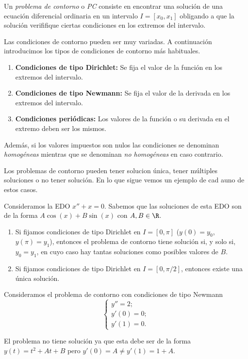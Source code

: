 \documentclass{article}
\begin{document}
\begin{definition}
  Un \emph{problema de contorno} o \emph{PC} consiste en encontrar una solución de una ecuación
  diferencial ordinaria en un intervalo $I = [x_0, x_1]$ obligando a que la solución verififique
  ciertas condiciones en los extremos del intervalo.
\end{definition}

Las condiciones de contorno pueden ser muy variadas. A continuación introducimos los tipos de
condiciones de contorno más habituales.

\begin{enumerate}
\item \textbf{Condiciones de tipo Dirichlet:} Se fija el valor de la función en los extremos del
  intervalo.
\item \textbf{Condiciones de tipo Newmann:} Se fija el valor de la derivada en los extremos del
  intervalo.
\item \textbf{Condiciones periódicas:} Los valores de la función o su derivada en el extremo deben
  ser los mismos.
\end{enumerate}

Además, si los valores impuestos son nulos las condiciones se denominan \emph{homogéneas} mientras
que se denominan \emph{no homogéneas} en caso contrario.

Los problemas de contorno pueden tener solucion única, tener múltiples soluciones o no tener
solución.  En lo que sigue vemos un ejemplo de cad auno de estos casos.

\begin{ex}
  Consideramos la EDO $x'' + x = 0$. Sabemos que las soluciones de esta EDO son de la forma
  $A \cos(x) + B \sin(x)$ con $A,B \in \R$.
  
  \begin{enumerate}
  \item Si fijamos condiciones de tipo Dirichlet en $I = [0,\pi]$ ($y(0) = y_0$, $y(\pi) = y_1$),
    entonces el problema de contorno tiene solución si, y solo si, $y_0 = y_1$, en cuyo caso hay
    tantas soluciones como posibles valores de $B$.
  \item Si fijamos condiciones de tipo Dirichlet en $I = [0, \pi / 2]$, entonces existe una única
    solución.
  \end{enumerate}
\end{ex}

\begin{ex} \label{ex:no-sol} Consideramos el problema de contorno con condiciones de tipo Newmann
  \[
    \begin{cases}
      y'' = 2; \\
      y'(0) = 0; \\
      y'(1) = 0.
    \end{cases}
  \]

  El problema no tiene solución ya que esta debe ser de la forma $y(t) = t^2 + A t + B$ pero
  $y'(0) = A \ne y'(1) = 1+A$.
\end{ex}
\end{document}
